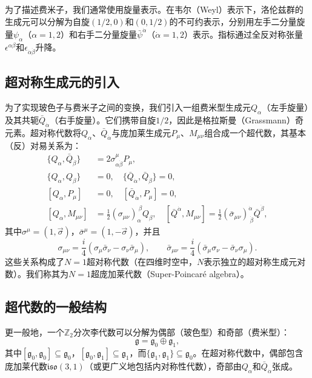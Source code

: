 为了描述费米子，我们通常使用旋量表示。在韦尔（Weyl）表示下，洛伦兹群的生成元可以分解为自旋$(1/2,0)$和$(0,1/2)$的不可约表示，分别用左手二分量旋量$\psi_\alpha$（$\alpha=1,2$）和右手二分量旋量$\bar\psi^{\dot\alpha}$（$\dot\alpha=1,2$）表示。指标通过全反对称张量$\epsilon^{\alpha\beta}$和$\epsilon_{\dot\alpha\dot\beta}$升降。

\subsection*{超对称生成元的引入}

为了实现玻色子与费米子之间的变换，我们引入一组费米型生成元$Q_\alpha$（左手旋量）及其共轭$\bar Q_{\dot\alpha}$（右手旋量）。它们携带自旋$1/2$，因此是格拉斯曼（Grassmann）奇元素。超对称代数将$Q_\alpha$、$\bar Q_{\dot\alpha}$与庞加莱生成元$P_\mu$、$M_{\mu\nu}$组合成一个超代数，其基本（反）对易关系为：
\begin{align}
\{ Q_\alpha, \bar Q_{\dot\beta} \} &= 2 \sigma^\mu_{\alpha\dot\beta} P_\mu, \label{eq:q_qbar} \\
\{ Q_\alpha, Q_\beta \} &= 0, \quad \{ \bar Q_{\dot\alpha}, \bar Q_{\dot\beta} \} = 0, \label{eq:q_q} \\
[ Q_\alpha, P_\mu ] &= 0, \quad [ \bar Q_{\dot\alpha}, P_\mu ] = 0, \label{eq:q_p} \\
[ Q_\alpha, M_{\mu\nu} ] &= \frac12 (\sigma_{\mu\nu})_\alpha^{\ \beta} Q_\beta, \quad [ \bar Q^{\dot\alpha}, M_{\mu\nu} ] = \frac12 (\bar\sigma_{\mu\nu})^{\dot\alpha}_{\ \dot\beta} \bar Q^{\dot\beta}, \label{eq:q_m}
\end{align}
其中$\sigma^\mu = (1, \vec\sigma)$，$\bar\sigma^\mu = (1, -\vec\sigma)$，并且
\begin{equation}
\sigma_{\mu\nu} = \frac{i}{4}(\sigma_\mu\bar\sigma_\nu - \sigma_\nu\bar\sigma_\mu), \qquad
\bar\sigma_{\mu\nu} = \frac{i}{4}(\bar\sigma_\mu\sigma_\nu - \bar\sigma_\nu\sigma_\mu).
\end{equation}
这些关系构成了$N=1$超对称代数（在四维时空中，$N$表示独立的超对称生成元对数）。我们称其为$N=1$超庞加莱代数（Super-Poincaré algebra）。

\subsection*{超代数的一般结构}

更一般地，一个$\mathbb{Z}_2$分次李代数可以分解为偶部（玻色型）和奇部（费米型）：
\begin{equation}
\mathfrak{g} = \mathfrak{g}_0 \oplus \mathfrak{g}_1,
\end{equation}
其中$[ \mathfrak{g}_0, \mathfrak{g}_0 ] \subseteq \mathfrak{g}_0$，$[ \mathfrak{g}_0, \mathfrak{g}_1 ] \subseteq \mathfrak{g}_1$，而$\{ \mathfrak{g}_1, \mathfrak{g}_1 \} \subseteq \mathfrak{g}_0$。在超对称代数中，偶部包含庞加莱代数$\mathfrak{iso}(3,1)$（或更广义地包括内对称性代数），奇部由$Q_\alpha$和$\bar Q_{\dot\alpha}$张成。

